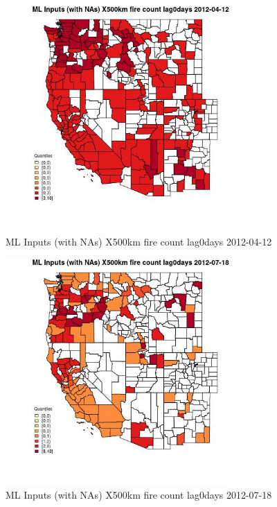 \begin{figure} 
\centering  
\includegraphics[width=0.77\textwidth]{Code_Outputs/Report_ML_input_PM25_Step4_part_e_de_duplicated_aves_compiled_2019-05-14wNAs_CountyX500km_fire_count_lag0daysMean2012-04-12_2012-04-12.jpg} 
\caption{\label{fig:Report_ML_input_PM25_Step4_part_e_de_duplicated_aves_compiled_2019-05-14wNAsCountyX500km_fire_count_lag0daysMean2012-04-12_2012-04-12}ML Inputs (with NAs) X500km fire count lag0days 2012-04-12} 
\end{figure} 
 

\begin{figure} 
\centering  
\includegraphics[width=0.77\textwidth]{Code_Outputs/Report_ML_input_PM25_Step4_part_e_de_duplicated_aves_compiled_2019-05-14wNAs_CountyX500km_fire_count_lag0daysMean2012-07-18_2012-07-18.jpg} 
\caption{\label{fig:Report_ML_input_PM25_Step4_part_e_de_duplicated_aves_compiled_2019-05-14wNAsCountyX500km_fire_count_lag0daysMean2012-07-18_2012-07-18}ML Inputs (with NAs) X500km fire count lag0days 2012-07-18} 
\end{figure} 
 

